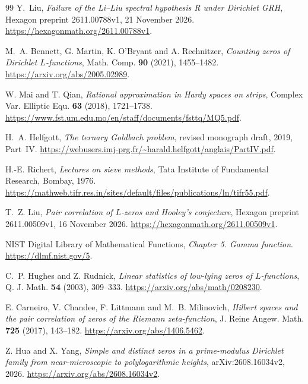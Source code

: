 \documentclass[11pt,a4paper]{article}
\numberwithin{equation}{section}
\begin{document}
{\begin{thebibliography}{99}
Y.~Liu,
\newblock \emph{Failure of the Li--Liu spectral hypothesis R under Dirichlet GRH},
\newblock Hexagon preprint 2611.00788v1, 21 November 2026.
\newblock \url{https://hexagonmath.org/2611.00788v1}.

M.~A. Bennett, G. Martin, K. O'Bryant and A. Rechnitzer,
\newblock \emph{Counting zeros of Dirichlet $L$-functions},
\newblock Math. Comp. \textbf{90} (2021), 1455--1482.
\newblock \url{https://arxiv.org/abs/2005.02989}.

W. Mai and T. Qian,
\newblock \emph{Rational approximation in Hardy spaces on strips},
\newblock Complex Var. Elliptic Equ. \textbf{63} (2018), 1721--1738.
\newblock \url{https://www.fst.um.edu.mo/en/staff/documents/fsttq/MQ5.pdf}.

H.~A. Helfgott,
\newblock \emph{The ternary Goldbach problem},
\newblock revised monograph draft, 2019, Part~IV.
\newblock \url{https://webusers.imj-prg.fr/~harald.helfgott/anglais/PartIV.pdf}.

H.-E. Richert,
\newblock \emph{Lectures on sieve methods},
\newblock Tata Institute of Fundamental Research, Bombay, 1976.
\newblock \url{https://mathweb.tifr.res.in/sites/default/files/publications/ln/tifr55.pdf}.

T.~Z. Liu,
\newblock \emph{Pair correlation of $L$-zeros and Hooley's conjecture},
\newblock Hexagon preprint 2611.00509v1, 16 November 2026.
\newblock \url{https://hexagonmath.org/2611.00509v1}.

NIST Digital Library of Mathematical Functions,
\newblock \emph{Chapter 5. Gamma function}.
\newblock \url{https://dlmf.nist.gov/5}.

C.~P. Hughes and Z. Rudnick,
\newblock \emph{Linear statistics of low-lying zeros of $L$-functions},
\newblock Q. J. Math. \textbf{54} (2003), 309--333.
\newblock \url{https://arxiv.org/abs/math/0208230}.

E. Carneiro, V. Chandee, F. Littmann and M.~B. Milinovich,
\newblock \emph{Hilbert spaces and the pair correlation of zeros of
the Riemann zeta-function},
\newblock J. Reine Angew. Math. \textbf{725} (2017), 143--182.
\newblock \url{https://arxiv.org/abs/1406.5462}.

Z. Hua and X. Yang,
\newblock \emph{Simple and distinct zeros in a prime-modulus Dirichlet
family from near-microscopic to polylogarithmic heights},
\newblock arXiv:2608.16034v2, 2026.
\newblock \url{https://arxiv.org/abs/2608.16034v2}.


\end{thebibliography}}
\end{document}
